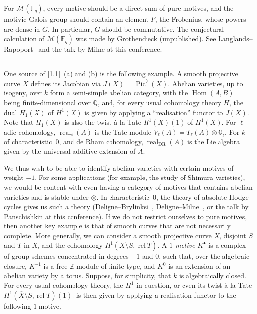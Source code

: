 \documentclass{article}
\theoremstyle{definition}
\newcommand{\sh}{\mathscr}
\newcommand{\ZZ}{\mathbb{Z}}
\newcommand{\QQ}{\mathbb{Q}}
\newcommand{\FF}{\mathbb{F}}
\DeclareMathOperator{\Pic}{Pic}
\DeclareMathOperator{\Hom}{Hom}
\DeclareMathOperator{\real}{real}
\newcommand{\oldpage}[1]{\marginpar{\footnotesize$\Big\vert$ \textit{p.~#1}}}
\begin{document}
For $\sh{M}(\FF_q)$, every motive should be a direct sum of pure motives, and the motivic Galois group should contain an element $F$, the Frobenius, whose powers are dense in $G$.
In particular, $G$ should be commutative.
The conjectural calculation of $\sh{M}(\FF_q)$ was made by Grothendieck (unpublished).
See Langlands--Rapoport~\cite{23} and the talk by Milne at this conference.


\subsection{}
\label{1.5}

One source of \cref{1.1}~(a) and (b) is the following example.
A smooth projective curve $X$ defines its Jacobian via $J(X)=\Pic^0(X)$.
Abelian varieties, up to isogeny, over $k$ form a semi-simple abelian category, with the $\Hom(A,B)$ being finite-dimensional over $\QQ$, and, for every usual cohomology theory $H$, the dual $H_1(X)$ of $H^1(X)$ is given by applying a ``realisation'' functor to $J(X)$.
Note that $H_1(X)$ is also the twist \`{a} la Tate $H^1(X)(1)$ of $H^1(X)$.
For $\ell$-adic cohomology, $\real_\ell(A)$ is the Tate module $V_\ell(A)=T_\ell(A)\otimes\QQ_\ell$.
For $k$ of characteristic~$0$, and
\oldpage{148}
de Rham cohomology, $\real_{\mathrm{DR}}(A)$ is the Lie algebra given by the universal additive extension of $A$.

We thus wish to be able to identify abelian varieties with certain motives of weight $-1$.
For some applications (for example, the study of Shimura varieties), we would be content with even having a category of motives that contains abelian varieties and is stable under $\otimes$.
In characteristic~$0$, the theory of absolute Hodge cycles gives us such a theory (Deligne--Brylinksi~\cite{11}, Deligne--Milne~\cite{12}, or the talk by Panschishkin at this conference).
If we do not restrict ourselves to pure motives, then another key example is that of smooth curves that are not necessarily complete.
More generally, we can consider a smooth projective curve $\overline{X}$, disjoint $S$ and $T$ in $\overline{X}$, and the cohomology $H^1(\overline{X}\setminus S,\operatorname{rel}T)$.
A \emph{$1$-motive} $K^\bullet$ is a complex of group schemes concentrated in degrees $-1$ and $0$, such that, over the algebraic closure, $K^{-1}$ is a free $\ZZ$-module of finite type, and $K^0$ is an extension of an abelian variety by a torus.
Suppose, for simplicity, that $k$ is algebraically closed.
For every usual cohomology theory, the $H^1$ in question, or even its twist \`{a} la Tate $H^1(\overline{X}\setminus S,\operatorname{rel}T)(1)$, is then given by applying a realisation functor to the following $1$-motive.
\end{document}
